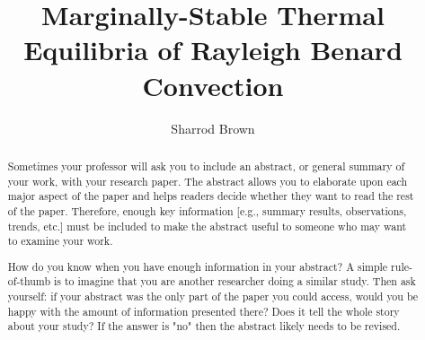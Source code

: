 \documentclass[twocolumn,showpacs,amsmath,amssymb]{revtex4}
\begin{document}
\title{Marginally-Stable Thermal Equilibria of Rayleigh Benard Convection}

\author{Sharrod Brown}




\begin{abstract}

Sometimes your professor will ask you to include an abstract, or general summary of your work, with your research paper. The abstract allows you to elaborate upon each major aspect of the paper and helps readers decide whether they want to read the rest of the paper. Therefore, enough key information [e.g., summary results, observations, trends, etc.] must be included to make the abstract useful to someone who may want to examine your work.

How do you know when you have enough information in your abstract? A simple rule-of-thumb is to imagine that you are another researcher doing a similar study. Then ask yourself: if your abstract was the only part of the paper you could access, would you be happy with the amount of information presented there? Does it tell the whole story about your study? If the answer is "no" then the abstract likely needs to be revised.

\end{abstract}
\end{document}
